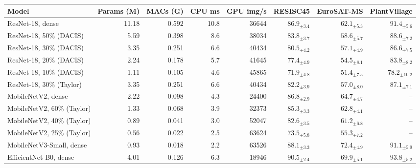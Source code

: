 \begin{tabular}{@{}lrrrrrrr@{}}
\toprule
Model & Params (M) & MACs (G) & CPU ms & GPU img/s & RESISC45 & EuroSAT-MS & PlantVillage \\
\midrule
ResNet-18, dense & 11.18 & 0.592 & 10.8 & 36644 & $86.9_{\pm3.4}$ & $62.1_{\pm5.3}$ & $91.4_{\pm5.6}$ \\
ResNet-18, 50\% (DACIS) & 5.59 & 0.398 & 8.6 & 38034 & $83.8_{\pm3.7}$ & $58.6_{\pm5.7}$ & $88.6_{\pm7.2}$ \\
ResNet-18, 30\% (DACIS) & 3.35 & 0.251 & 6.6 & 40434 & $80.5_{\pm4.2}$ & $57.1_{\pm4.9}$ & $86.6_{\pm7.5}$ \\
ResNet-18, 20\% (DACIS) & 2.24 & 0.178 & 5.7 & 41645 & $77.4_{\pm4.9}$ & $54.5_{\pm8.1}$ & $83.8_{\pm8.2}$ \\
ResNet-18, 10\% (DACIS) & 1.11 & 0.105 & 4.6 & 45865 & $71.9_{\pm4.8}$ & $51.4_{\pm7.5}$ & $78.2_{\pm10.2}$ \\
ResNet-18, 30\% (Taylor) & 3.35 & 0.251 & 6.6 & 40434 & $82.2_{\pm3.9}$ & $57.0_{\pm8.0}$ & $87.1_{\pm7.1}$ \\
\midrule
MobileNetV2, dense & 2.22 & 0.098 & 4.3 & 24400 & $86.8_{\pm2.9}$ & $64.7_{\pm4.7}$ & -- \\
MobileNetV2, 60\% (Taylor) & 1.33 & 0.068 & 3.9 & 32373 & $85.3_{\pm3.3}$ & $62.8_{\pm4.1}$ & -- \\
MobileNetV2, 40\% (Taylor) & 0.89 & 0.041 & 3.0 & 52047 & $82.6_{\pm3.5}$ & $61.2_{\pm6.8}$ & -- \\
MobileNetV2, 25\% (Taylor) & 0.56 & 0.022 & 2.5 & 63624 & $73.5_{\pm5.8}$ & $55.3_{\pm7.2}$ & -- \\
\midrule
MobileNetV3-Small, dense & 0.93 & 0.018 & 2.2 & 63526 & $88.1_{\pm3.3}$ & $72.4_{\pm4.9}$ & $91.1_{\pm5.9}$ \\
EfficientNet-B0, dense & 4.01 & 0.126 & 6.3 & 18946 & $90.5_{\pm2.4}$ & $69.9_{\pm5.1}$ & $93.8_{\pm5.2}$ \\
\bottomrule
\end{tabular}